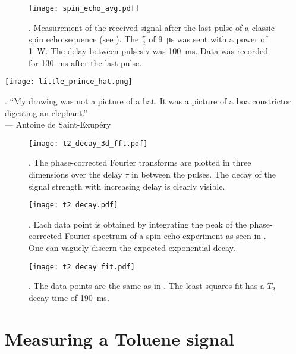 \begin{figure}[h!bt]
    \centering
    \texttt{[image: spin\_echo\_avg.pdf]}
    \caption{. Measurement of the received signal after the last pulse of a classic spin echo sequence (see ). The \(\frac{\pi}{2}\) of \qty{9}{\micro\second} was sent with a power of \qty{1}{\watt}. The delay between pulses \(\tau\) was \qty{100}{\milli\second}. Data was recorded for \qty{130}{\milli\second} after the last pulse.}
\end{figure}

\begin{marginfigure}
    \centering
    \texttt{[image: little\_prince\_hat.png]}
    \caption{. \enquote{My drawing was not a picture of a hat. It was a picture of a boa constrictor digesting an elephant.}\\
        --- Antoine de Saint-Exupéry}
\end{marginfigure}

\begin{figure}[h!bt]
    \centering
    \texttt{[image: t2\_decay\_3d\_fft.pdf]}
    \caption{. The phase-corrected Fourier transforms are plotted in three dimensions over the delay \(\tau\) in between the pulses. The decay of the signal strength with increasing delay is clearly visible.}
\end{figure}

\begin{figure}[h!bt]
    \centering
    \texttt{[image: t2\_decay.pdf]}
    \caption{. Each data point is obtained by integrating the peak of the phase-corrected Fourier spectrum of a spin echo experiment as seen in . One can vaguely discern the expected exponential decay.}
\end{figure}

\begin{figure}[h!bt]
    \centering
    \texttt{[image: t2\_decay\_fit.pdf]}
    \caption{. The data points are the same as in . The least-squares fit has a \(T_2\) decay time of \qty{190}{\milli\second}.}
\end{figure}

\section{Measuring a Toluene signal}

